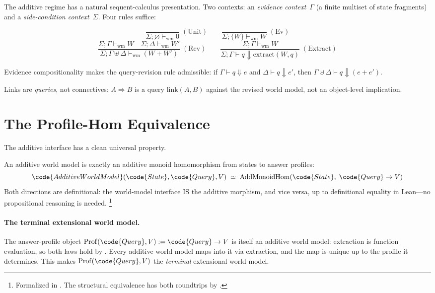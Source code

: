 \documentclass[11pt,openany]{report}
\begin{document}
The additive regime has a natural sequent-calculus presentation.
Two contexts: an \emph{evidence context}~$\Gamma$ (a finite multiset
of state fragments) and a \emph{side-condition context}~$\Sigma$.
Four rules suffice:

\[
\frac{}{\Sigma; \varnothing \vdash_{\mathrm{wm}} 0} \;(\text{Unit})
\qquad
\frac{}{\Sigma; \{W\} \vdash_{\mathrm{wm}} W} \;(\text{Ev})
\]
\[
\frac{\Sigma; \Gamma \vdash_{\mathrm{wm}} W \quad
      \Sigma; \Delta \vdash_{\mathrm{wm}} W'}
     {\Sigma; \Gamma \uplus \Delta \vdash_{\mathrm{wm}} (W + W')}
\;(\text{Rev})
\qquad
\frac{\Sigma; \Gamma \vdash_{\mathrm{wm}} W}
     {\Sigma; \Gamma \vdash q \Downarrow \mathrm{extract}(W, q)}
\;(\text{Extract})
\]

\noindent
Evidence compositionality makes the query-revision rule admissible:
if $\Gamma \vdash q \Downarrow e$ and $\Delta \vdash q \Downarrow e'$,
then $\Gamma \uplus \Delta \vdash q \Downarrow (e + e')$.

Links are \emph{queries}, not connectives: $A \Rightarrow B$ is a
query $\mathrm{link}(A, B)$ against the revised world model, not an
object-level implication.


\section{The Profile-Hom Equivalence}
\label{sec:profile-hom}

The additive interface has a clean universal property.

\begin{theorem}
\label{thm:universal-property}
An additive world model is exactly an additive monoid homomorphism
from states to answer profiles:
\[
  \code{AdditiveWorldModel}(\code{State}, \code{Query}, V)
  \;\simeq\;
  \mathrm{AddMonoidHom}(\code{State},\; \code{Query} \to V)
\]
Both directions are definitional: the world-model interface IS the
additive morphism, and vice versa, up to definitional equality in
Lean---no propositional reasoning is needed.%
\footnote{Formalized in .
The structural equivalence  has both
roundtrips by .}
\end{theorem}

\paragraph{The terminal extensional world model.}
The answer-profile object $\mathrm{Prof}(\code{Query}, V) :=
\code{Query} \to V$ is itself an additive world model: extraction is
function evaluation, so both laws hold by .  Every additive
world model maps into it via extraction, and the map is unique up to
the profile it determines.  This makes $\mathrm{Prof}(\code{Query}, V)$
the \emph{terminal} extensional world model.
\end{document}
